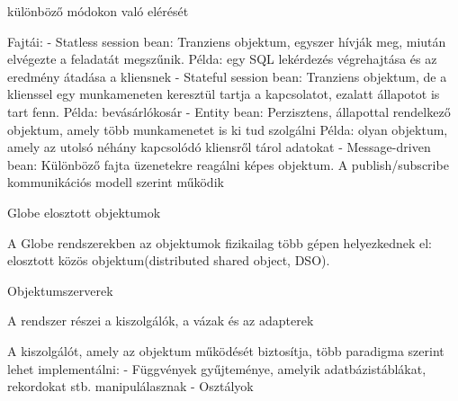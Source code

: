 \documentclass[12pt]{article}
\begin{document}
\begin{description}
                                                                        különböző módokon való elérését
                                                                    \item Fajtái:
                                                                        - Statless session bean: Tranziens objektum, egyszer hívják meg, miután elvégezte a feladatát megszűnik.
                                                                        Példa: egy SQL lekérdezés végrehajtása és az eredmény átadása a kliensnek
                                                                        - Stateful session bean: Tranziens objektum, de a klienssel egy munkameneten keresztül tartja a kapcsolatot,
                                                                        ezalatt állapotot is tart fenn. Példa: bevásárlókosár
                                                                        - Entity bean: Perzisztens, állapottal rendelkező objektum, amely több munkamenetet is ki tud szolgálni
                                                                        Példa: olyan objektum, amely az utolsó néhány kapcsolódó kliensről tárol adatokat
                                                                        - Message-driven bean: Különböző fajta üzenetekre reagálni képes objektum. A publish/subscribe kommunikációs
                                                                        modell szerint működik
                                                                    \item  Globe elosztott objektumok
                                                                    \item A Globe rendszerekben az objektumok fizikailag több gépen helyezkednek el: elosztott közös objektum(distributed shared object, DSO).
                                                                    \item  Objektumszerverek
                                                                    \item A rendszer részei a kiszolgálók, a vázak és az adapterek
                                                                    \item A kiszolgálót, amely az objektum működését biztosítja, több paradigma szerint lehet implementálni:
                                                                        - Függvények gyűjteménye, amelyik adatbázistáblákat, rekordokat stb.
                                                                        manipulálasznak
                                                                        - Osztályok

\end{description}
\end{document}
